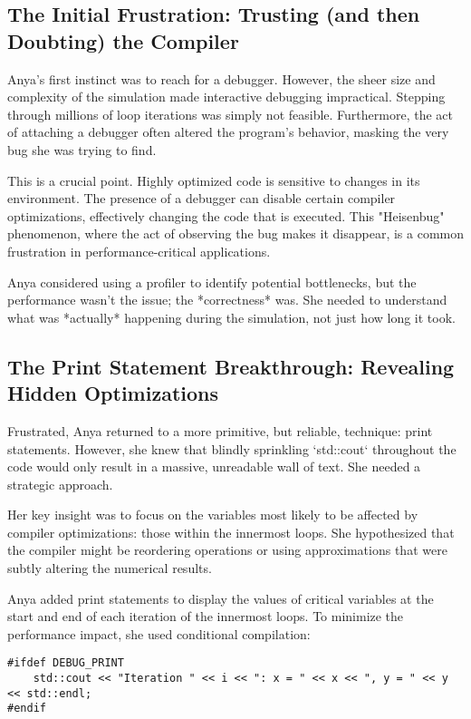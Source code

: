 \documentclass{article}
\begin{document}
{{{{\subsection*{The Initial Frustration: Trusting (and then Doubting) the Compiler}

Anya's first instinct was to reach for a debugger. However, the sheer size and complexity of the simulation made interactive debugging impractical. Stepping through millions of loop iterations was simply not feasible. Furthermore, the act of attaching a debugger often altered the program's behavior, masking the very bug she was trying to find.

This is a crucial point. Highly optimized code is sensitive to changes in its environment. The presence of a debugger can disable certain compiler optimizations, effectively changing the code that is executed. This "Heisenbug" phenomenon, where the act of observing the bug makes it disappear, is a common frustration in performance-critical applications.

Anya considered using a profiler to identify potential bottlenecks, but the performance wasn't the issue; the *correctness* was. She needed to understand what was *actually* happening during the simulation, not just how long it took.

\subsection*{The Print Statement Breakthrough: Revealing Hidden Optimizations}

Frustrated, Anya returned to a more primitive, but reliable, technique: print statements. However, she knew that blindly sprinkling `std::cout` throughout the code would only result in a massive, unreadable wall of text. She needed a strategic approach.

Her key insight was to focus on the variables most likely to be affected by compiler optimizations: those within the innermost loops. She hypothesized that the compiler might be reordering operations or using approximations that were subtly altering the numerical results.

Anya added print statements to display the values of critical variables at the start and end of each iteration of the innermost loops. To minimize the performance impact, she used conditional compilation:

\begin{verbatim}
#ifdef DEBUG_PRINT
    std::cout << "Iteration " << i << ": x = " << x << ", y = " << y << std::endl;
#endif
\end{verbatim}

}}}}
\end{document}

